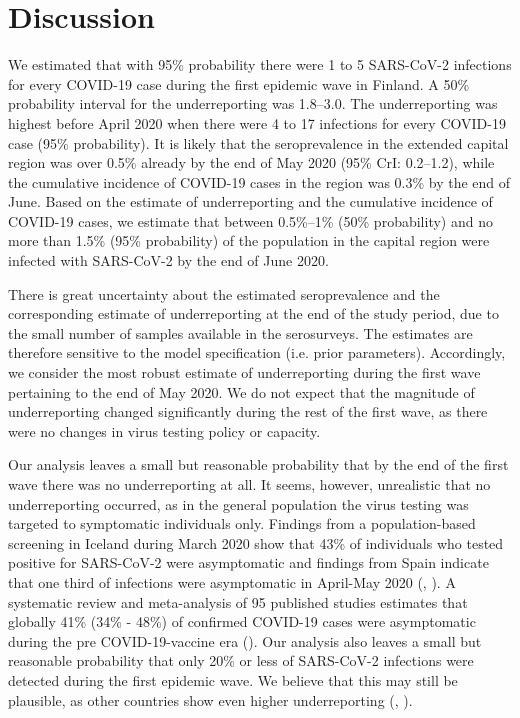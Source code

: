 \documentclass[aoas]{imsart}
\begin{document}
\section{Discussion}


We estimated that with 95\% probability there were 1 to 5 SARS-CoV-2 infections for every COVID-19 case during the first epidemic wave in Finland. A 50\% probability interval for the underreporting was 1.8–3.0. The underreporting was highest before April 2020 when there were 4 to 17 infections for every COVID-19 case (95\% probability). It is likely that the seroprevalence in the extended capital region was over 0.5\% already by the end of May 2020 (95\% CrI: 0.2–1.2), while the cumulative incidence of COVID-19 cases in the region was 0.3\% by the end of June. Based on the estimate of underreporting and the cumulative incidence of COVID-19 cases, we estimate that between 0.5\%–1\% (50\% probability) and no more than 1.5\% (95\% probability) of the population in the capital region were infected with SARS-CoV-2 by the end of June 2020. 

There is great uncertainty about the estimated seroprevalence and the corresponding estimate of underreporting at the end of the study period, due to the small number of samples available in the serosurveys. The estimates are therefore sensitive to the model specification (i.e. prior parameters). Accordingly, we consider the most robust estimate of underreporting during the first wave pertaining to the end of May 2020. We do not expect that the magnitude of underreporting changed significantly during the rest of the first wave, as there were no changes in virus testing policy or capacity. 

Our analysis leaves a small but reasonable probability that by the end of the first wave there was no underreporting at all. It seems, however, unrealistic that no underreporting occurred, as in the general population the virus testing was targeted to symptomatic individuals only. Findings from a population-based screening in Iceland during March 2020 show that 43\% of individuals who tested positive for SARS-CoV-2 were asymptomatic and findings from Spain indicate that one third of infections were asymptomatic in April-May 2020 (\cite{gudbjartsson2020}, \cite{Pollan2020}). A systematic review and meta-analysis of 95 published studies estimates that globally 41\% (34\% - 48\%) of confirmed COVID-19 cases were asymptomatic during the pre COVID-19-vaccine era (\cite{jamameta}). Our analysis also leaves a small but reasonable probability that only 20\% or less of SARS-CoV-2 infections were detected during the first epidemic wave. We believe that this may still be plausible, as other countries show even higher underreporting (\cite{Pollan2020}, \cite{erikstrup2020}).
\end{document}

